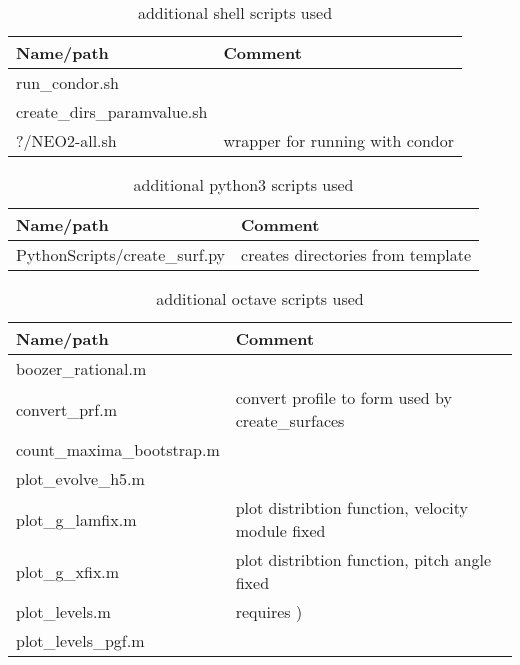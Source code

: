 \documentclass{article}
\newcommand{\vv}[1]{\texttt{\detokenize{#1}}}
\begin{document}
\begin{table}[h]
\centering
\begin{tabular}{l|l}
Name/path   & Comment \\ \hline
run\_condor.sh & \\
create\_dirs\_paramvalue.sh & \\
?/NEO2-all.sh & wrapper for running with condor
\end{tabular}
\caption{additional shell scripts used}
\label{tab:additionalshellscripts}
\end{table}

\begin{table}[h]
\centering
\begin{tabular}{l|l}
Name/path   & Comment \\ \hline
PythonScripts/create\_surf.py & creates directories from template
\end{tabular}
\caption{additional python3 scripts used}
\label{tab:additionalpython3scripts}
\end{table}

\begin{table}[h]
\centering
\begin{tabular}{l|l}
Name/path   & Comment \\ \hline
boozer\_rational.m & \\
convert\_prf.m & convert profile to form used by create\_surfaces \\
count\_maxima\_bootstrap.m & \\
plot\_evolve\_h5.m & \\
plot\_g\_lamfix.m & plot distribtion function, velocity module fixed \\
plot\_g\_xfix.m & plot distribtion function, pitch angle fixed \\
plot\_levels.m & requires \vv{magnetics.h5}) \\
plot\_levels\_pgf.m &
\end{tabular}
\caption{additional octave scripts used}
\label{tab:additionaloctavescripts}
\end{table}

\end{document}
